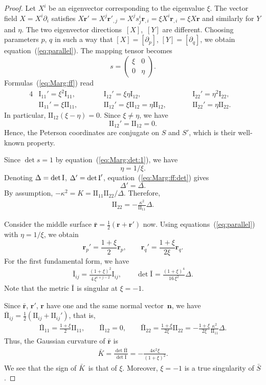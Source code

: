 \documentclass[pdftex]{sigma}
\let\ve\mathbf
\def\I#1#2{\mathrm{I}_{#1#2}}
\def\II#1#2{\mathrm{II}_{#1#2}}
\def\barI#1#2{\bar{\mathrm{I}}_{#1#2}}
\def\barII#1#2{\bar{\mathrm{II}}_{#1#2}}
\def\detI{{\rm det\,I}}
\def\k{\kappa}
\def\eqref#1{{\rm(\ref{#1})}}
\numberwithin{equation}{section}
\begin{document}
\begin{proof}
Let $X^i$ be an eigenvector corresponding to the eigenvalue $\xi$.
The vector field $X = X^i \partial_i$ satisfies
$X \ve r' = X^j \ve r'_{,j}
 = X^j s^i_j \ve r_{,i}
 = \xi X^i \ve r_{,i}
 = \xi X \ve r$ and similarly for $Y$ and $\eta$.
The two eigenvector directions~$[X]$,~$[Y]$ are different.
Choosing parameters $p$, $q$ in such a way that $[X] = [\partial_p]$,
$[Y] = [\partial_q]$, we obtain equation~\eqref{eq:parallel}.
The mapping tensor becomes
\[
s = \begin{pmatrix} \xi & 0 \\ 0 & \eta \end{pmatrix}.
\]
Formulas~\eqref{eq:Marg:ff} read
\begin{alignat*}{4}
&\I 11' = \xi^2 \I 11,
&&\qquad \I 12' = \xi \eta \I 12,
&&\qquad \I 22' = \eta^2 \I 22,&
\\
&\II 11' = \xi \II 11,
&&\qquad \II 12' = \xi\II 12 = \eta\II 12,
&&\qquad \II 22' = \eta \II 22.&
\end{alignat*}
In particular, $\II12(\xi - \eta) = 0$.
Since $\xi\ne \eta$, we have
\[
\II 12' = \II 12 = 0.
\]
Hence,  the Peterson coordinates are conjugate on $S$ and $S'$,
which is their well-known property.

Since $\det s = 1$ by equation~\eqref{eq:Marg:det:1}, we have
\[
\eta = 1/\xi.
\]
Denoting $\Delta = \detI$, $\Delta' = \detI'$, equation~\eqref{eq:Marg:ff:det}
gives
\[
\Delta' = \Delta.
\]
By assumption, $-\kappa^2 = K = \II 11 \II 22/\Delta$.
Therefore,
\begin{gather}\label{eq:II22}
\II 22 = -\frac{\k^2}{\II 11} \Delta.
\end{gather}

Consider the middle surface $\bar{\ve r}= \frac12(\ve r + \ve r')$ now.
Using equations~\eqref{eq:parallel} with $\eta = 1/\xi$, we obtain %
\[
\ve r_p' = \frac{1 + \xi}{2} \ve r_p,
\qquad
\ve r_q' = \frac{1 + \xi}{2 \xi}  \ve r_q.
\]
For the first fundamental form, we have
\begin{gather}\label{eq:Ir}
\barI ij = \frac{(1 + \xi)^2}{4\,\xi^{i+j-2}} \I ij,
\qquad
\det\barI{}{} %
 = \frac{(1 + \xi)^4}{16\,\xi^2} \Delta.
\end{gather}
Note that the metric $\barI{}{}$ is singular at $\xi = -1$.

Since $\bar{\ve r}$, $\ve r'$, $\ve r$ have one and the same normal
vector~$\ve n$, we have
$\barII ij = \frac12(\II ij + \II ij')$, that is,
\begin{gather}\label{eq:IIij}
\barII11 = \frac{1 + \xi}{2} \II 11,
\qquad
\barII12 = 0,
\qquad
\barII22 = \frac{1 + \xi}{2\xi} \II 22
 = -\frac{1 + \xi}{2 \xi} \frac{\k^2}{\II 11} \Delta.
\end{gather}
Thus, the Gaussian curvature of $\bar{\ve r}$ is %
\begin{gather}\label{eq:K}
\bar K = \frac{\det\barII{}{}}{\det\barI{}{}}
 = -\frac{4 \k^2 \xi}{(1 + \xi)^2}.
\end{gather}
We see that the sign of $\bar K$ is that of $\xi$.
Moreover, $\xi = -1$ is a true singularity of $\bar S$.


\end{proof}
\end{document}
